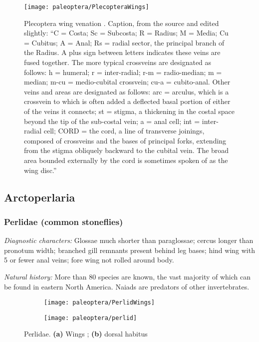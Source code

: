 \begin{figure}[ht!]
  \centering
    \texttt{[image: paleoptera/PlecopteraWings]}
  \caption{Plecoptera wing venation \citep[modified from][Fig. 1]{bhl29875}. Caption, from the source and edited slightly: ``C = Costa; Sc = Subcosta; R = Radius; M = Media; Cu = Cubitus; A = Anal; Rs = radial sector, the principal branch of the Radius. A plus sign between letters indicates these veins are fused together. The more typical crossveins are designated as follows: h = humeral; r = inter-radial; r-m = radio-median; m = median; m-cu = medio-cubital crossvein; cu-a = cubito-anal. Other veins and areas are designated as follows: arc = arculus, which is a crossvein to which is often added a deflected basal portion of either of the veins it connects; st = stigma, a thickening in the costal space beyond the tip of the sub-costal vein; a = anal cell; int = inter-radial cell; CORD = the cord, a line of transverse joinings, composed of crossveins and the bases of principal forks, extending from the stigma obliquely backward to the cubital vein. The broad area bounded externally by the cord is sometimes spoken of as the wing disc.''}
  \label{fig:plecowings}
\end{figure}

\subsection{Arctoperlaria}
\subsubsection{Perlidae (common stoneflies)}
\noindent{}\textit{Diagnostic characters:} Glossae much shorter than paraglossae; cercus longer than pronotum width; branched gill remnants present behind leg bases; hind wing with 5 or fewer anal veins; fore wing not rolled around body.\vspace{3mm}

\noindent{}\textit{Natural history:} More than 80 species are known, the vast majority of which can be found in eastern North America. Naiads are predators of other invertebrates.\vspace{3mm} 

\begin{figure}[ht!]
    \centering
    \begin{subfigure}[ht!]{0.45\textwidth}
        \texttt{[image: paleoptera/PerlidWings]}
        \caption{}
        \label{fig:perlid1}
    \end{subfigure}
    \qquad
    \begin{subfigure}[ht!]{0.45\textwidth}
        \texttt{[image: paleoptera/perlid]}
        \caption{}
        \label{fig:perlid2}
    \end{subfigure}
    \caption{Perlidae. \textbf{(a)} Wings \citep[modified from][Plate 11, Fig. 3]{bhl29875}; \textbf{(b)} dorsal habitus \citep[redrawn from][Fig. 18]{bhl29875}}\label{fig:perlids}
\end{figure}


